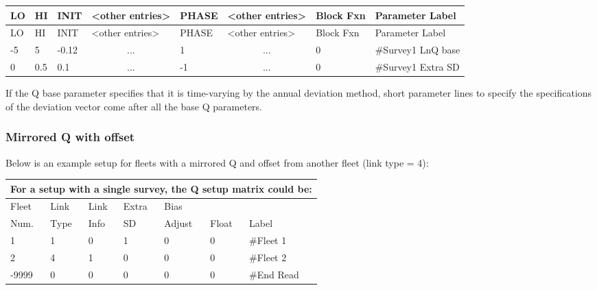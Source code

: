 \begin{longtable}{p{1cm} p{1cm} p{1cm}  p{1.5cm}  p{1.5cm} p{1.5cm}  p{1.75cm}  p{4cm} }
	\hline
	LO \Tstrut & HI & INIT & <other entries> & PHASE & <other entries> & Block Fxn & Parameter Label\Bstrut\\
	\hline
	\endfirsthead

	\hline
	LO \Tstrut & HI & INIT & <other entries> & PHASE & <other entries> &Block Fxn & Parameter Label\Bstrut\\
	\hline
	\endhead

	\hline
	\endfoot
	\endlastfoot

	-5 & 5   & -0.12 & \multicolumn{1}{c}{...} & 1  & \multicolumn{1}{c}{...} & 0  & \#Survey1 LnQ base\Tstrut\\
	0  & 0.5 & 0.1   & \multicolumn{1}{c}{...} & -1 & \multicolumn{1}{c}{...} & 0  & \#Survey1 Extra SD\Bstrut\\
	\hline
\end{longtable}

If the Q base parameter specifies that it is time-varying by the annual deviation method, short parameter lines to specify the specifications of the deviation vector come after all the base Q parameters.

\hypertarget{MirrorQoffset}{}
\subsubsection{Mirrored Q with offset}
Below is an example setup for fleets with a mirrored Q and offset from another fleet (link type = 4):
\begin{longtable}{p{2cm} p{2cm} p{2cm} p{2cm} p{2cm} p{1.3cm} p{2.3cm}}
	\multicolumn{7}{l}{For a setup with a single survey, the Q setup matrix could be:}\\
	\hline
	Fleet \Tstrut & Link & Link & Extra  & Bias   &   & \\
	Num.          & Type & Info & SD     & Adjust & Float  & Label\Bstrut\\
	\hline
	1 & 1 & 0 & 1 & 0 & 0 & \#Fleet 1  \Tstrut\\
	2 & 4 & 1 & 0 & 0 & 0 & \#Fleet 2  \Tstrut\\
	-9999 & 0 & 0 & 0 & 0 & 0 & \#End Read \Bstrut\\
	\hline
\end{longtable}


